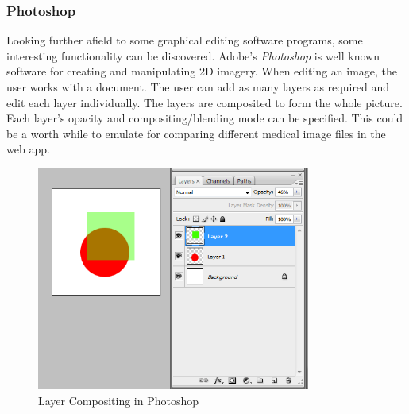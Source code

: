 \documentclass[a4paper,11pt,titlepage]{article}
\begin{document}
\subsubsection{Photoshop}
Looking further afield to some graphical editing software programs, some interesting functionality can be discovered. Adobe's \textit{Photoshop} is well known software for creating and manipulating 2D imagery. When editing an image, the user works with a document. The user can add as many layers as required and edit each layer individually. The layers are composited to form the whole picture. Each layer's opacity and compositing/blending mode can be specified. This could be a worth while to emulate for comparing different medical image files in the web app.


\begin{figure}[ht!]
\centering
\includegraphics[width=90mm]{..//literatureSurvey/graphics/photoshop_01.png}
\caption{Layer Compositing in Photoshop}
\label{fig:UIdesign1}
\end{figure}
\end{document}
